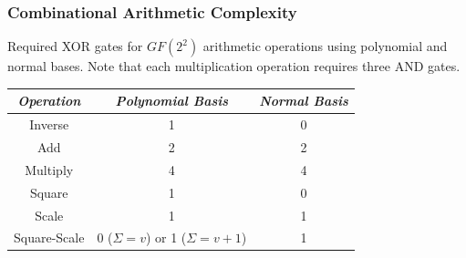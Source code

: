 \documentclass[10pt]{beamer}
\begin{document}





\begin{frame}
	\frametitle{Combinational Arithmetic Complexity}
Required XOR gates for $GF(2^2)$ arithmetic operations using polynomial and normal bases. Note that each multiplication operation requires three AND gates.
\begin{table}[ht!]
\begin{center}
	\begin{tabular}{| c | c | c |} \hline
	\emph{Operation} & \emph{Polynomial Basis} & \emph{Normal Basis} \\ \hline
	Inverse      & 1 & 0 \\
	Add          & 2 & 2 \\
	Multiply     & 4 & 4 \\
	Square       & 1 & 0 \\
	Scale        & 1 & 1 \\
	Square-Scale & 0 ($\Sigma = v$) or 1 ($\Sigma = v + 1$) & 1 \\ \hline
	\end{tabular}
\end{center}
\end{table}
\end{frame}
\end{document}

